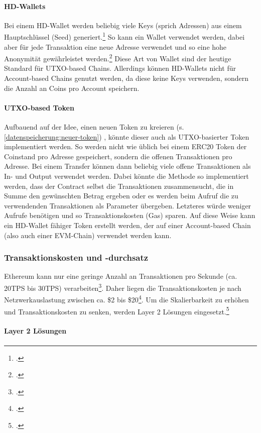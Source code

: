 \documentclass[12pt, a4paper]{article}
\begin{document}
{\paragraph{HD-Wallets}
Bei einem HD-Wallet werden beliebig viele Keys (sprich Adressen) aus einem Hauptschlüssel (Seed) generiert.\footcite[Vgl. hierzu und weiterführend][S. 8 ff\adddot]{q9}
So kann ein Wallet verwendet werden, dabei aber für jede Transaktion eine neue Adresse verwendet und so eine hohe Anonymität gewährleistet werden.\footcite[Vgl.][231]{q5}
Diese Art von Wallet sind der heutige Standard für UTXO-based Chains.
Allerdings können HD-Wallets nicht für Account-based Chains genutzt werden, da diese keine Keys verwenden, sondern die Anzahl an Coins pro Account speichern.

\paragraph{UTXO-based Token}
Aufbauend auf der Idee, einen neuen Token zu kreieren (s. \ref{datenspeicherung:neuer-token}) , könnte dieser auch als UTXO-basierter Token implementiert werden.
So werden nicht wie üblich bei einem ERC20 Token der Coinstand pro Adresse gespeichert, sondern die offenen Transaktionen pro Adresse.
Bei einem Transfer können dann beliebig viele offene Transaktionen als In- und Output verwendet werden.
Dabei könnte die Methode so implementiert werden, dass der Contract selbst die Transaktionen zusammensucht, die in Summe den gewünschten Betrag ergeben oder es werden beim Aufruf die zu verwendenden Transaktionen als Parameter übergeben.
Letzteres würde weniger Aufrufe benötigen und so Transaktionskosten (Gas) sparen.
Auf diese Weise kann ein HD-Wallet fähiger Token erstellt werden, der auf einer Account-based Chain (also auch einer EVM-Chain) verwendet werden kann.
\subsubsection{Transaktionskosten und -durchsatz}
Ethereum kann nur eine geringe Anzahl an Transaktionen pro Sekunde (ca. 20TPS bis 30TPS)  verarbeiten\footcite[Vgl.][]{w36}. 
Daher liegen die Transaktionskosten je nach Netzwerkauslastung zwischen ca. \$2 bis \$20\footcite[Vgl.][]{w35}.
Um die Skalierbarkeit zu erhöhen und Transaktionskosten zu senken, werden Layer 2 Lösungen eingesetzt.\footcite[Vgl.][]{w17}

\paragraph{Layer 2 Lösungen}
\label{sec:definition-layer-2-solutions}

}
\end{document}
